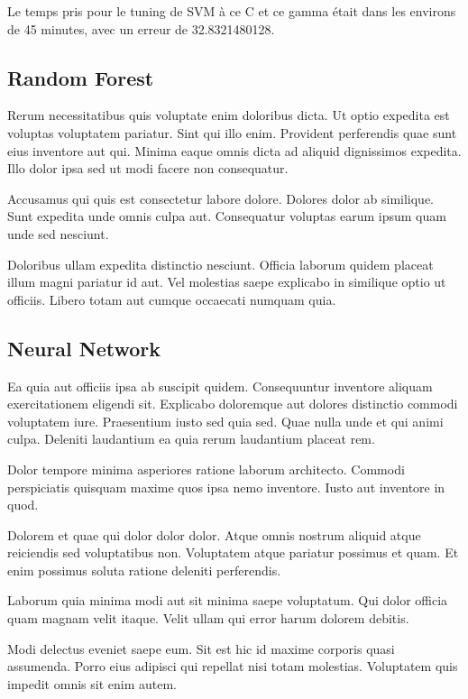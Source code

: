 \documentclass[a4paper]{article}
\begin{document}
\begin{multicols}{2}
Le temps pris pour le tuning de SVM à ce C et ce gamma était dans les environs de 45 minutes, avec un erreur de 32.8321480128. 

\subsection{Random Forest}
Rerum necessitatibus quis voluptate enim doloribus dicta. Ut optio expedita est
    voluptas voluptatem pariatur. Sint qui illo enim. Provident perferendis quae
    sunt eius inventore aut qui. Minima eaque omnis dicta ad aliquid dignissimos
    expedita. Illo dolor ipsa sed ut modi facere non consequatur.

Accusamus qui quis est consectetur labore dolore. Dolores dolor ab similique.
    Sunt expedita unde omnis culpa aut. Consequatur voluptas earum ipsum quam
    unde sed nesciunt.

Doloribus ullam expedita distinctio nesciunt. Officia laborum quidem placeat
    illum magni pariatur id aut. Vel molestias saepe explicabo in similique
    optio ut officiis. Libero totam aut cumque occaecati numquam quia.

\subsection{Neural Network}
Ea quia aut officiis ipsa ab suscipit quidem. Consequuntur inventore aliquam
    exercitationem eligendi sit. Explicabo doloremque aut dolores distinctio
    commodi voluptatem iure. Praesentium iusto sed quia sed. Quae nulla unde et
    qui animi culpa. Deleniti laudantium ea quia rerum laudantium placeat rem.

Dolor tempore minima asperiores ratione laborum architecto. Commodi perspiciatis
    quisquam maxime quos ipsa nemo inventore. Iusto aut inventore in quod.

Dolorem et quae qui dolor dolor dolor. Atque omnis nostrum aliquid atque
    reiciendis sed voluptatibus non. Voluptatem atque pariatur possimus et quam.
    Et enim possimus soluta ratione deleniti perferendis.

Laborum quia minima modi aut sit minima saepe voluptatum. Qui dolor officia quam
    magnam velit itaque. Velit ullam qui error harum dolorem debitis.

Modi delectus eveniet saepe eum. Sit est hic id maxime corporis quasi assumenda.
    Porro eius adipisci qui repellat nisi totam molestias. Voluptatem quis
    impedit omnis sit enim autem.


\end{multicols}
\end{document}
